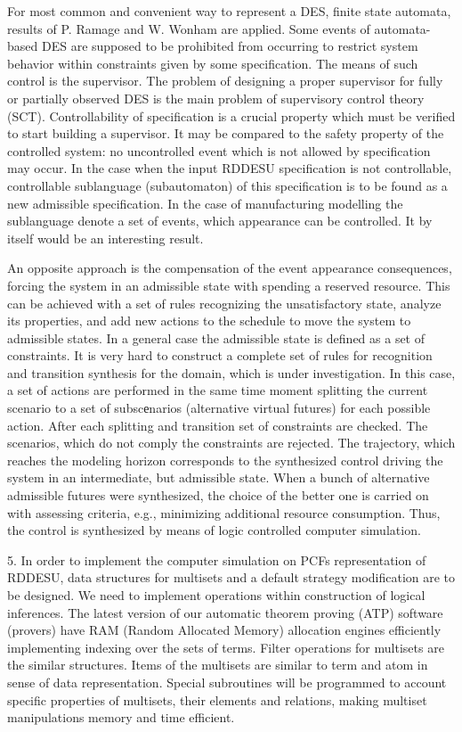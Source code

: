\documentclass[runningheads]{llncs}
\begin{document}
For most common and convenient way to represent a DES, finite state automata, results of P. Ramage and W. Wonham are applied. Some events of automata-based DES are supposed to be prohibited from occurring to restrict system behavior within constraints given by some specification. The means of such control is the supervisor. The problem of designing a proper supervisor for fully or partially observed DES is the main problem of supervisory control theory (SCT). Controllability of specification is a crucial property which must be verified to start building a supervisor. It may be compared to the safety property of the controlled system: no uncontrolled event which is not allowed by specification may occur. In the case when the input RDDESU specification is not controllable, controllable sublanguage (subautomaton) of this specification is to be found as a new admissible specification. In the case of manufacturing modelling the sublanguage denote a set of events, which appearance can be controlled. It by itself would be an interesting result.

An opposite approach is the compensation of the event appearance consequences, forcing the system in an admissible state with spending a reserved resource. This can be achieved with a set of rules recognizing the unsatisfactory state, analyze its properties, and add new actions to the schedule to move the system to admissible states. In a general case the admissible state is defined as a set of constraints. It is very hard to construct a complete set of rules for recognition and transition synthesis for the domain, which is under investigation. In this case, a set of actions are performed in the same time moment splitting the current scenario to a set of subscеnarios (alternative virtual futures) for each possible action. After each splitting and transition set of constraints are checked. The scenarios, which do not comply the constraints are rejected. The trajectory, which reaches the modeling horizon corresponds to the synthesized control driving the system in an intermediate, but admissible state. When a bunch of alternative admissible futures were synthesized, the choice of the better one is carried on with assessing criteria, e.g., minimizing additional resource consumption. Thus, the control is synthesized by means of logic controlled computer simulation.

5. In order to implement the computer simulation on PCFs representation of RDDESU, data structures for multisets and a default strategy modification are to be designed. We need to implement operations within construction of logical inferences. The latest version of our automatic theorem proving (ATP) software (provers) have RAM (Random Allocated Memory) allocation engines efficiently implementing indexing over the sets of terms. Filter operations for multisets are the similar structures. Items of the multisets are similar to term and atom in sense of data representation. Special subroutines will be programmed to account specific properties of multisets, their elements and relations, making multiset manipulations memory and time efficient.
\end{document}
